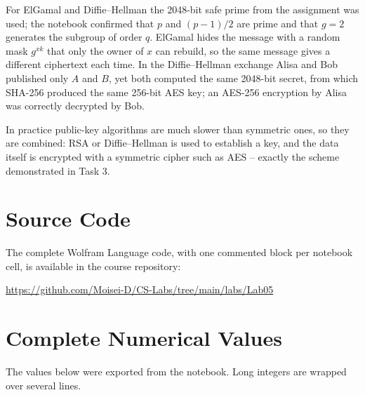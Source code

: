 \documentclass[12pt,a4paper]{article}
\begin{document}
For ElGamal and Diffie--Hellman the 2048-bit safe prime from the assignment was used; the notebook confirmed that $p$ and $(p-1)/2$ are prime and that $g = 2$ generates the subgroup of order $q$. ElGamal hides the message with a random mask $g^{xk}$ that only the owner of $x$ can rebuild, so the same message gives a different ciphertext each time. In the Diffie--Hellman exchange Alisa and Bob published only $A$ and $B$, yet both computed the same 2048-bit secret, from which SHA-256 produced the same 256-bit AES key; an AES-256 encryption by Alisa was correctly decrypted by Bob.

In practice public-key algorithms are much slower than symmetric ones, so they are combined: RSA or Diffie--Hellman is used to establish a key, and the data itself is encrypted with a symmetric cipher such as AES -- exactly the scheme demonstrated in Task 3.

\section{Source Code}

The complete Wolfram Language code, with one commented block per notebook cell, is available in the course repository:

\begin{center}
  \url{https://github.com/Moisei-D/CS-Labs/tree/main/labs/Lab05}
\end{center}

\newpage
\appendix
\renewcommand{\thesection}{\Alph{section}}
\section{Complete Numerical Values}

The values below were exported from the notebook. Long integers are wrapped over several lines.

\end{document}
